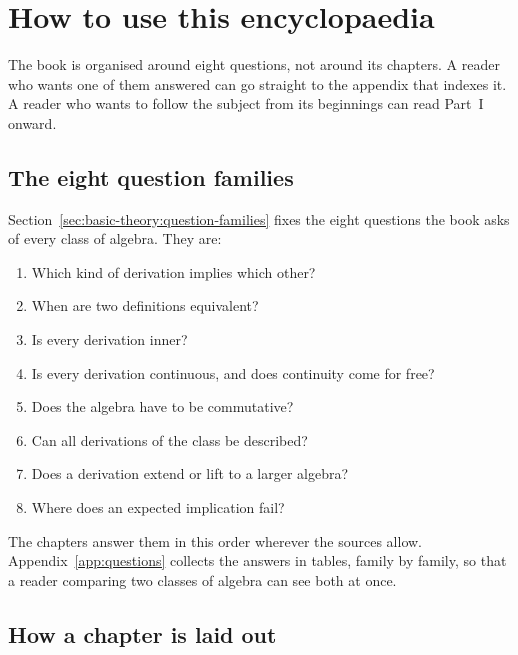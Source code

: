 \chapter*{How to use this encyclopaedia}
\label{page:how-to-use}

The book is organised around eight questions, not around its chapters.
A reader who wants one of them answered can go straight to the
appendix that indexes it. A reader who wants to follow the subject from its
beginnings can read Part~I onward.

\section*{The eight question families}

Section~\ref{sec:basic-theory:question-families} fixes the eight questions the
book asks of every class of algebra. They are:

\begin{enumerate}
\item Which kind of derivation implies which other?
\item When are two definitions equivalent?
\item Is every derivation inner?
\item Is every derivation continuous, and does continuity come for free?
\item Does the algebra have to be commutative?
\item Can all derivations of the class be described?
\item Does a derivation extend or lift to a larger algebra?
\item Where does an expected implication fail?
\end{enumerate}

The chapters answer them in this order wherever the sources allow.
Appendix~\ref{app:questions} collects the answers in tables, family by family,
so that a reader comparing two classes of algebra can see both at once.

\section*{How a chapter is laid out}

